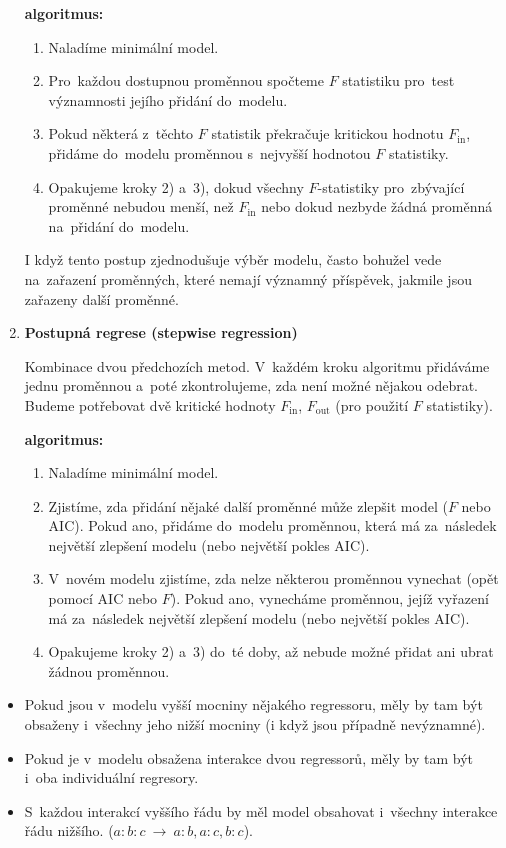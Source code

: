 \begin{enumerate}[1)]
\textbf{algoritmus:}\begin{enumerate}[	1)]
	\item Naladíme minimální model.
	\item Pro~každou dostupnou proměnnou spočteme $F$ statistiku pro~test významnosti jejího přidání do~modelu.
	\item Pokud některá z~těchto $F$ statistik překračuje kritickou hodnotu $F_\mathrm{in}$, přidáme do~modelu proměnnou s~nejvyšší hodnotou $F$ statistiky.
	\item Opakujeme kroky 2) a~3), dokud všechny $F$-statistiky pro~zbývající proměnné nebudou menší, než $F_\mathrm{in}$ nebo dokud nezbyde žádná proměnná na~přidání do~modelu.
\end{enumerate}
\begin{remark}
	I když tento postup zjednodušuje výběr modelu, často bohužel vede na~zařazení proměnných, které nemají významný příspěvek, jakmile jsou zařazeny další proměnné.
\end{remark}

\item
\textbf{Postupná regrese (stepwise regression)}

Kombinace dvou předchozích metod. V~každém kroku algoritmu přidáváme jednu proměnnou a~poté zkontrolujeme, zda není možné nějakou odebrat. Budeme potřebovat  dvě kritické hodnoty $F_\mathrm{in}$, $F_\mathrm{out}$ (pro použití $F$ statistiky).

\textbf{algoritmus:}\begin{enumerate}[	1)]
	\item Naladíme minimální model.
	\item Zjistíme, zda přidání nějaké další proměnné může zlepšit model ($F$ nebo AIC). Pokud ano, přidáme do~modelu proměnnou, která má za~následek největší zlepšení modelu (nebo největší pokles AIC).
	\item V~novém modelu zjistíme, zda nelze některou proměnnou vynechat (opět pomocí AIC nebo $F$). Pokud ano, vynecháme proměnnou, jejíž vyřazení má za~následek největší zlepšení modelu (nebo největší pokles AIC).
	\item Opakujeme kroky 2) a~3) do~té doby, až nebude možné přidat ani ubrat žádnou proměnnou.
\end{enumerate}
\end{enumerate}

\begin{remark}
	\begin{itemize}
		\item Pokud jsou v~modelu vyšší mocniny nějakého regressoru, měly by tam být obsaženy i~všechny jeho nižší mocniny (i když jsou případně nevýznamné).
		\item Pokud je v~modelu obsažena interakce dvou regressorů, měly by tam být i~oba individuální regresory.
		\item S~každou interakcí vyššího řádu by měl model obsahovat i~všechny interakce řádu nižšího. ($a:b:c~\to~a:b,a:c,b:c$).
	\end{itemize}
\end{remark}

